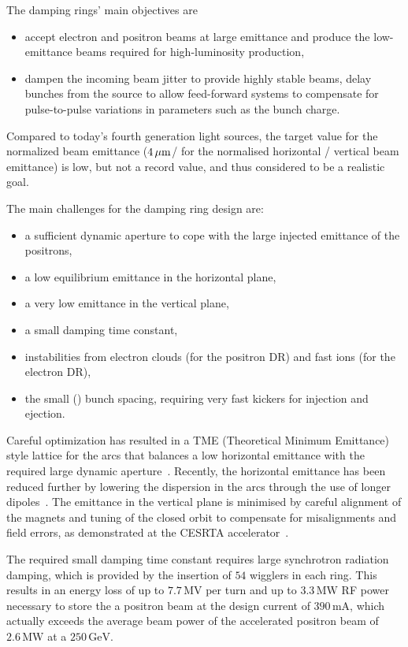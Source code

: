 The damping rings' main objectives are
\begin{itemize} 
\item accept electron and positron beams at large emittance and produce the low-emittance beams required for high-luminosity production,
\item dampen the incoming beam jitter to provide highly stable beams,
delay bunches from the source to allow feed-forward systems to compensate for pulse-to-pulse variations in parameters such as the bunch charge.
\end{itemize}

Compared to today's fourth generation light sources, the target value for the normalized beam emittance ($4\,{\mathrm{\mu m}}$/ for the normalised horizontal / vertical beam emittance) is low, but not a record value, and thus considered to be a realistic goal.

The main challenges for the damping ring design are:
\begin{itemize} 
\item a sufficient dynamic aperture to cope with the large injected emittance of the positrons,
\item a low equilibrium emittance in the horizontal plane,
\item a very low emittance in the vertical plane,
\item a small damping time constant,
\item instabilities from electron clouds (for the positron DR) and fast ions (for the electron DR),
\item the small () bunch spacing, requiring very fast kickers for injection and ejection.
\end{itemize}

Careful optimization has resulted in a TME (Theoretical Minimum Emittance) style lattice for the arcs that balances a low horizontal emittance with the required large dynamic aperture~\cite[Chap. 6]{Adolphsen:2013kya}. 
Recently, the horizontal emittance has been reduced further by lowering the dispersion in the arcs through the use of longer dipoles~\cite{bib:cr-0016}.
The emittance in the vertical plane is minimised by careful alignment of the magnets and tuning of the closed orbit to compensate for misalignments and field errors, as demonstrated at the CESRTA accelerator~\cite{Billing:2011zc}.

The required small damping time constant requires large synchrotron radiation damping, which is provided by the insertion of $54$ wigglers in each ring.
This results in an energy loss of up to $7.7\,{\mathrm{MV}}$ per turn and up to $3.3\,{\mathrm{MW}}$ RF power necessary to 
store the a positron beam at the design current of $390\,{\mathrm{mA}}$, which
actually exceeds the average beam power of the accelerated positron beam of $2.6\,{\mathrm{MW}}$ at 
a $250\,{\mathrm{GeV}}$.

